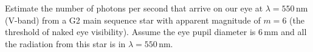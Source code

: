 Estimate the number of photons per second that arrive on our eye at
$\lambda = 550$\,nm (V-band) from a G2 main sequence star with apparent
magnitude of $m = 6$ (the threshold of naked eye visibility). Assume the eye
pupil diameter is 6\,mm and all the radiation from this star is in
$\lambda = 550$\,nm.

